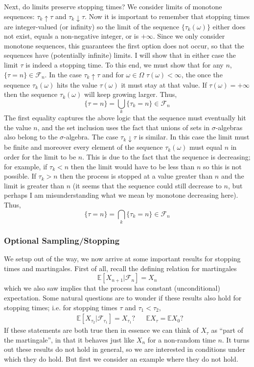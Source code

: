 \documentclass[12pt]{article}
\newcommand{\E}{\mathbb{E}}
\begin{document}
Next, do limits preserve stopping times? We consider limits of monotone sequences: $\tau_k \uparrow \tau$ and $\tau_k \downarrow \tau$. Now it is important to remember that stopping times 
are integer-valued (or infinity) so the limit of the sequence $\{\tau_k(\omega)\}$ either does not exist, equals a non-negative integer, or is $+\infty$. Since we only consider monotone sequences, 
this guarantees the first option does not occur, so that the sequences have (potentially infinite) limits. I will show that in either case the limit $\tau$ is indeed a stopping time. To this end, we must 
show that for any $n$, $\{\tau = n\} \in \mathcal{F}_n$. In the case $\tau_k \uparrow \tau$ and for $\omega \in \Omega$ $\tau(\omega) < \infty$, the 
once the sequence $\tau_k(\omega)$ hits the value $\tau(\omega)$ it must stay at that value. If $\tau(\omega) = +\infty$ then the sequence $\tau_k(\omega)$ will keep growing larger. Thus, 
\[\{\tau = n\} = \bigcup_k \{\tau_k = n\} \in \mathcal{F}_n\]
The first equality captures the above logic that the sequence must eventually hit the value $n$, and the set inclusion uses the fact that unions of sets in $\sigma$-algebras also belong to 
the $\sigma$-algebra. The case $\tau_k \downarrow \tau$ is similar. In this case the limit must be finite and moreover every element of the sequence $\tau_k(\omega)$ must equal $n$ in order for 
the limit to be $n$. This is due to the fact that the sequence is decreasing; for example, if $\tau_k < n$ then the limit would have to be less than $n$ so this is not possible. If $\tau_k > n$ then the 
process is stopped at a value greater than $n$ and the limit is greater than $n$ (it seems that the sequence could still decrease to $n$, but perhaps I am misunderstanding what we mean by 
monotone decreasing here). Thus, 
\[\{\tau = n\} = \bigcap_k \{\tau_k = n\} \in \mathcal{F}_n\]

\subsubsection{Optional Sampling/Stopping}
We setup out of the way, we now arrive at some important results for stopping times and martingales. First of all, recall the defining relation for martingales 
\[\E[X_{n + 1}|\mathcal{F}_n] = X_n\]
which we also saw implies that the process has constant (unconditional) expectation. Some natural questions are to wonder if these results also hold for 
stopping times; i.e. for stopping times $\tau$ and $\tau_1 < \tau_2$,
\begin{align*}
&\E[X_{\tau_2}|\mathcal{F}_{\tau_1}] = X_{\tau_1}? &&\E X_{\tau} = \E X_0?
\end{align*}
If these statements are both true then in essence we can think of $X_\tau$ as ``part of the martingale'', in that it behaves just like $X_n$ for a non-random time $n$. 
It turns out these results do not hold in general, so we are interested in conditions under which they do hold. But first we consider an example where they do not hold. 
\end{document}
